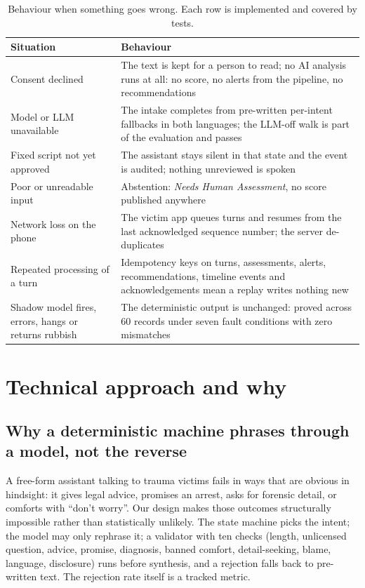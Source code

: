 \documentclass[11pt,a4paper]{article}
\begin{document}
\begin{table}[!htbp]
\centering\small
\caption{Behaviour when something goes wrong. Each row is implemented and covered by tests.}
\label{tab:degraded}
\begin{tabularx}{\linewidth}{@{}>{\raggedright\arraybackslash}p{3.8cm}X@{}}
\toprule
Situation & Behaviour \\
\midrule
Consent declined & The text is kept for a person to read; no AI analysis runs at all: no score, no
alerts from the pipeline, no recommendations \\
Model or LLM unavailable & The intake completes from pre-written per-intent fallbacks in both
languages; the LLM-off walk is part of the evaluation and passes \\
Fixed script not yet approved & The assistant stays silent in that state and the event is audited;
nothing unreviewed is spoken \\
Poor or unreadable input & Abstention: \emph{Needs Human Assessment}, no score published anywhere \\
Network loss on the phone & The victim app queues turns and resumes from the last acknowledged
sequence number; the server de-duplicates \\
Repeated processing of a turn & Idempotency keys on turns, assessments, alerts, recommendations,
timeline events and acknowledgements mean a replay writes nothing new \\
Shadow model fires, errors, hangs or returns rubbish & The deterministic output is unchanged: proved
across 60 records under seven fault conditions with zero mismatches \\
\bottomrule
\end{tabularx}
\end{table}

\section{Technical approach and why}
\label{sec:approach}

\subsection{Why a deterministic machine phrases through a model, not the reverse}
\label{sec:guardrails}
A free-form assistant talking to trauma victims fails in ways that are obvious in hindsight: it gives
legal advice, promises an arrest, asks for forensic detail, or comforts with ``don't worry''. Our
design makes those outcomes structurally impossible rather than statistically unlikely. The state
machine picks the intent; the model may only rephrase it; a validator with ten checks (length,
unlicensed question, advice, promise, diagnosis, banned comfort, detail-seeking, blame, language,
disclosure) runs before synthesis, and a rejection falls back to pre-written text. The rejection rate
itself is a tracked metric.
\end{document}
